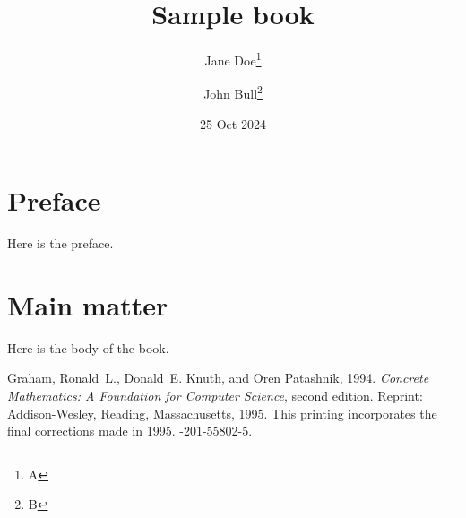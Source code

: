 \documentclass{book}
\title{Sample book}
\author{Jane Doe\thanks{A} \and John Bull\thanks{B}}
\date{25 Oct 2024}
\begin{document}
\frontmatter

\maketitle

\tableofcontents

\chapter*{Preface}

Here is the preface.

\mainmatter

\chapter{Main matter}

Here is the body of the book.

\begin{thebibliography}{9}

Graham, Ronald~L., Donald~E. Knuth, and Oren Patashnik, 1994.
\newblock \emph{Concrete Mathematics: A Foundation for Computer Science},
  second edition.
\newblock Reprint: Addison-Wesley, Reading, Massachusetts, 1995.
\newblock This printing incorporates the final corrections made in 1995.
-201-55802-5.

\end{thebibliography}
\end{document}
